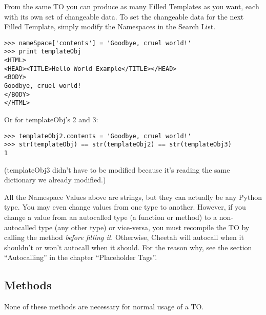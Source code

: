From the same TO you can produce as many Filled Templates as you
want, each with its own set of changeable data.  To set the changeable data for
the next Filled Template, simply modify the Namespaces in the Search List.

\begin{verbatim}
>>> nameSpace['contents'] = 'Goodbye, cruel world!'
>>> print templateObj
<HTML>
<HEAD><TITLE>Hello World Example</TITLE></HEAD>
<BODY>
Goodbye, cruel world!
</BODY>
</HTML>
\end{verbatim}

Or for templateObj's 2 and 3:

\begin{verbatim}
>>> templateObj2.contents = 'Goodbye, cruel world!'
>>> str(templateObj) == str(templateObj2) == str(templateObj3)
1
\end{verbatim}

(templateObj3 didn't have to be modified because it's reading the same
 dictionary we already modified.)

All the Namespace Values above are strings, but they can actually be any Python
type.  You may even change values from one type to another.  However, if you
change a value from an autocalled type (a function or method) to a
non-autocalled type (any other type) or vice-versa, you must recompile the
TO by calling the  method {\em before filling it}.
Otherwise, Cheetah will autocall when it shouldn't or
won't autocall when it should.  For the reason why, see the section
``Autocalling'' in the chapter ``Placeholder Tags''.




\subsection{Methods}

None of these methods are necessary for normal usage of a TO.

